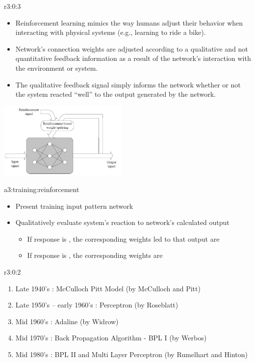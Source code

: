 \documentclass{tron}
\begin{document}
\begin{remark}{r3:0:3}
	\begin{itemize}
		\item Reinforcement learning mimics the way humans adjust their behavior when interacting with physical systems (e.g., learning to ride a bike).
		\item Network’s connection weights are adjusted according to a qualitative and not quantitative feedback information as a result of the network’s interaction with the environment or system.
		\item The qualitative feedback signal simply informs the network whether or not the system reacted “well” to the output generated by the network.
	\end{itemize}
	
	\includegraphics[width=240px]{Figs/Lec4/reinforcement}
	
	\begin{algo}[Training]{a3:training:reinforcement}
	\begin{itemize}
		\item Present training input pattern network
		\item Qualitatively evaluate system’s reaction to network’s calculated output
		\begin{itemize}
			\item If response is , the corresponding weights led to that output are 
			\item If response is , the corresponding weights are 
		\end{itemize}
	\end{itemize}
	\end{algo}
\end{remark}

\begin{remark}{r3:0:2}
	\begin{enumerate}
		\item Late 1940’s : McCulloch Pitt Model (by McCulloch and Pitt)
		\item Late 1950’s – early 1960’s : Perceptron (by Roseblatt)
		\item Mid 1960’s : Adaline (by Widrow)
		\item Mid 1970’s : Back Propagation Algorithm - BPL I (by Werbos)
		\item Mid 1980’s : BPL II and Multi Layer Perceptron (by Rumelhart and Hinton)
	\end{enumerate}
\end{remark}
\end{document}
